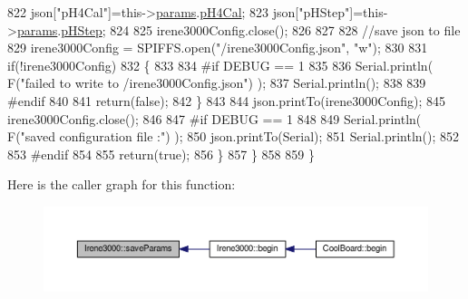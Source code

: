 \begin{DoxyCode}
822             json[\textcolor{stringliteral}{"pH4Cal"}]=this->\hyperlink{class_irene3000_a136585a5ee7f9ac6ab52175fa153f8e3}{params}.\hyperlink{struct_irene3000_1_1parameters___t_a1144de6fb54eb3e1dd2a3d8c2afc97dc}{pH4Cal};
823             json[\textcolor{stringliteral}{"pHStep"}]=this->\hyperlink{class_irene3000_a136585a5ee7f9ac6ab52175fa153f8e3}{params}.\hyperlink{struct_irene3000_1_1parameters___t_a61cfcc2539d5f630e9071f3753aba9fe}{pHStep};         
824             
825             irene3000Config.close();
826             
827             
828             \textcolor{comment}{//save json to file}
829             irene3000Config = SPIFFS.open(\textcolor{stringliteral}{"/irene3000Config.json"}, \textcolor{stringliteral}{"w"});
830 
831             \textcolor{keywordflow}{if}(!irene3000Config)
832             \{
833             
834 \textcolor{preprocessor}{            #if DEBUG == 1}
835 
836                 Serial.println( F(\textcolor{stringliteral}{"failed to write to /irene3000Config.json"}) );
837                 Serial.println();
838             
839 \textcolor{preprocessor}{            #endif }
840 
841                 \textcolor{keywordflow}{return}(\textcolor{keyword}{false});
842             \}
843 
844             json.printTo(irene3000Config);
845             irene3000Config.close();
846             
847 \textcolor{preprocessor}{        #if DEBUG == 1 }
848 
849             Serial.println( F(\textcolor{stringliteral}{"saved configuration file :"})  );
850             json.printTo(Serial);
851             Serial.println();
852         
853 \textcolor{preprocessor}{        #endif}
854 
855             \textcolor{keywordflow}{return}(\textcolor{keyword}{true}); 
856         \}
857     \}   
858 
859 \}
\end{DoxyCode}
Here is the caller graph for this function\+:\nopagebreak
\begin{figure}[H]
\begin{center}
\leavevmode
\includegraphics[width=350pt]{d6/d03/class_irene3000_a63dbd38e79b8cd5f1fba4b245501a894_icgraph}
\end{center}
\end{figure}
\mbox{\label{class_irene3000_aff7c5da186b388e7272e63ff88a20c34}} 
